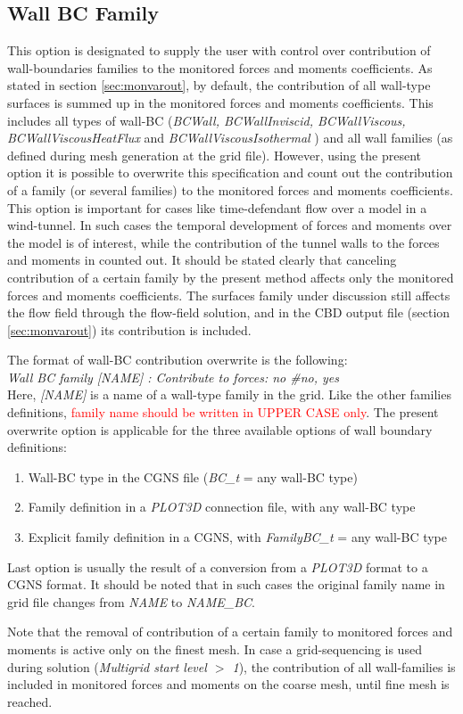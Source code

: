 \documentclass[12pt,epsf,colordvi]{article}
\begin{document}
\subsection{Wall BC Family } \label{sec:wbcfam}
%
This option is designated to supply the user with control over contribution of wall-boundaries families to the monitored forces and moments coefficients. As stated in section \ref{sec:monvarout}, by default, the contribution of all wall-type surfaces is summed up in the monitored forces and moments coefficients. This includes all types of wall-BC ({\it BCWall, BCWallInviscid, BCWallViscous, BCWallViscousHeatFlux } and {\it BCWallViscousIsothermal} ) and all wall families (as defined during mesh generation at the grid file). However, using the present option it is possible to overwrite this specification and count out the contribution of a family (or several families) to the monitored forces and moments coefficients. This option is important for cases like time-defendant flow over a model in a wind-tunnel. In such cases the temporal development of forces and moments over the model is of interest, while the contribution of the tunnel walls to the forces and moments in counted out. It should be stated clearly that canceling contribution of a certain family by the present method affects only the monitored forces and moments coefficients. The surfaces family under discussion still affects the flow field through the flow-field solution, and in the CBD output file (section \ref{sec:monvarout}) its contribution is included.

The format of wall-BC contribution overwrite is the following:\\
{\it Wall BC family [NAME] :  Contribute to forces: no   \#no, yes} \\
Here, {\it [NAME]} is a name of a wall-type family in the grid. Like the other families definitions, \textcolor{red}{family name should be written in UPPER CASE only}. The present overwrite option is applicable for the three available options of wall boundary definitions:
\begin{enumerate}
 \item Wall-BC type in the CGNS file ({\it BC\_t} = any wall-BC type)
 \item Family definition in a {\it PLOT3D} connection file, with any wall-BC type
\item Explicit family definition in a CGNS, with {\it FamilyBC\_t} = any wall-BC type
\end{enumerate}
Last option is usually the result of a conversion from a {\it PLOT3D} format to a CGNS format. It should be noted that in such cases the original family name in grid file changes from {\it NAME} to {\it NAME\_BC}.

Note that the removal of contribution of a certain family to monitored forces and moments is active only on the finest mesh. In case a grid-sequencing is used during solution ({\it Multigrid start level \(>\) 1}), the contribution of all wall-families is included in monitored forces and moments on the coarse mesh, until fine mesh is reached.


% 
 
\end{document}
